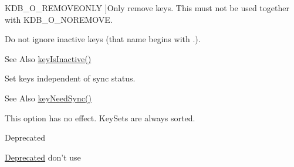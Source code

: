 \begin{Desc}
\begin{description}
{\hypertarget{group__kdb_gga98a3d6a4016c9dad9cbd1a99a9c2a45aaf6ed09cee8aa8cf0d6a0e318a7105440}{K\-D\-B\-\_\-\-O\-\_\-\-R\-E\-M\-O\-V\-E\-O\-N\-L\-Y}\label{group__kdb_gga98a3d6a4016c9dad9cbd1a99a9c2a45aaf6ed09cee8aa8cf0d6a0e318a7105440}
}]Only remove keys. This must not be used together with K\-D\-B\-\_\-\-O\-\_\-\-N\-O\-R\-E\-M\-O\-V\-E. \item[{\em 
\hypertarget{group__kdb_gga98a3d6a4016c9dad9cbd1a99a9c2a45aa789926d8a8e15b029cf7dded4154bcda}{K\-D\-B\-\_\-\-O\-\_\-\-I\-N\-A\-C\-T\-I\-V\-E}\label{group__kdb_gga98a3d6a4016c9dad9cbd1a99a9c2a45aa789926d8a8e15b029cf7dded4154bcda}
}]Do not ignore inactive keys (that name begins with .). \begin{DoxySeeAlso}{See Also}
\hyperlink{group__keytest_gaa25f699f592031c1a0abc1504d14e13e}{key\-Is\-Inactive()} 
\end{DoxySeeAlso}
\item[{\em 
\hypertarget{group__kdb_gga98a3d6a4016c9dad9cbd1a99a9c2a45aaa7d5265eacbb1590982b718f35443e2e}{K\-D\-B\-\_\-\-O\-\_\-\-S\-Y\-N\-C}\label{group__kdb_gga98a3d6a4016c9dad9cbd1a99a9c2a45aaa7d5265eacbb1590982b718f35443e2e}
}]Set keys independent of sync status. \begin{DoxySeeAlso}{See Also}
\hyperlink{group__keytest_gaf247df0de7aca04b32ef80e39ef12950}{key\-Need\-Sync()} 
\end{DoxySeeAlso}
\item[{\em 
\hypertarget{group__kdb_gga98a3d6a4016c9dad9cbd1a99a9c2a45aad9d03b36ee88ca5a774cc01b190c99b8}{K\-D\-B\-\_\-\-O\-\_\-\-S\-O\-R\-T}\label{group__kdb_gga98a3d6a4016c9dad9cbd1a99a9c2a45aad9d03b36ee88ca5a774cc01b190c99b8}
}]This option has no effect. Key\-Sets are always sorted. \begin{DoxyRefDesc}{Deprecated}
\item[\hyperlink{deprecated__deprecated000001}{Deprecated}]don't use \end{DoxyRefDesc}

\end{description}
\end{Desc}
